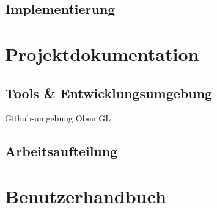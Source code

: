 \documentclass[11pt]{article}
\begin{document}
\subsection{Implementierung}

\section{Projektdokumentation}

\subsection{Tools \& Entwicklungsumgebung}
Github-umgebung
Oben GL

\subsection{Arbeitsaufteilung}

\section{Benutzerhandbuch}

\pagebreak

\end{document}
